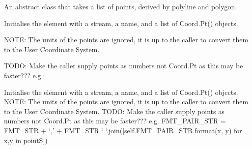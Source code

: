 \documentclass[letterpaper,10pt,english]{sphinxmanual}
\begin{document}

\begin{fulllineitems}
\label{\detokenize{ref/util/plot/SVGWriter:TotalDepth.util.plot.SVGWriter.SVGPointList}}
An abstract class that takes a list of points, derived by polyline and polygon.

Initialise the element with a stream, a name, and a list of Coord.Pt() objects.

NOTE: The units of the points are ignored, it is up to the caller to convert
them to the User Coordinate System.

TODO: Make the caller supply points as numbers not Coord.Pt as this may be faster??? e.g.:

\begin{sphinxVerbatim}[commandchars=\\\{\}]
      
\PYG{p}{[}     \PYG{p}{]}
\end{sphinxVerbatim}

\begin{fulllineitems}
\label{\detokenize{ref/util/plot/SVGWriter:TotalDepth.util.plot.SVGWriter.SVGPointList.__init__}}
Initialise the element with a stream, a name, and a list of Coord.Pt() objects.
NOTE: The units of the points are ignored, it is up to the caller to convert
them to the User Coordinate System.
TODO: Make the caller supply points as numbers not Coord.Pt as this may be faster???
e.g.
FMT\_PAIR\_STR = FMT\_STR + ‘,’ + FMT\_STR
‘ ‘.join({[}self.FMT\_PAIR\_STR.format(x, y) for x,y in pointS{]})

\end{fulllineitems}


\end{fulllineitems}
\end{document}

